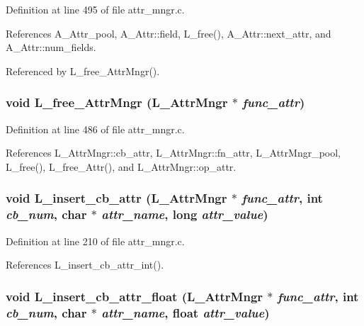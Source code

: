 Definition at line 495 of file attr\_\-mngr.c.

References A\_\-Attr\_\-pool, A\_\-Attr::field, L\_\-free(), A\_\-Attr::next\_\-attr, and A\_\-Attr::num\_\-fields.

Referenced by L\_\-free\_\-Attr\-Mngr().
\subsubsection{\setlength{\rightskip}{0pt plus 5cm}void L\_\-free\_\-Attr\-Mngr (\bf{L\_\-Attr\-Mngr} $\ast$ {\em func\_\-attr})}\label{attr__mngr_8c_8fc357fe60c6e8bb81f20cf00d53ed53}




Definition at line 486 of file attr\_\-mngr.c.

References L\_\-Attr\-Mngr::cb\_\-attr, L\_\-Attr\-Mngr::fn\_\-attr, L\_\-Attr\-Mngr\_\-pool, L\_\-free(), L\_\-free\_\-Attr(), and L\_\-Attr\-Mngr::op\_\-attr.
\subsubsection{\setlength{\rightskip}{0pt plus 5cm}void L\_\-insert\_\-cb\_\-attr (\bf{L\_\-Attr\-Mngr} $\ast$ {\em func\_\-attr}, int {\em cb\_\-num}, char $\ast$ {\em attr\_\-name}, long {\em attr\_\-value})}\label{attr__mngr_8c_bbb04f1c8e901782b4fe073cce7e94ed}




Definition at line 210 of file attr\_\-mngr.c.

References L\_\-insert\_\-cb\_\-attr\_\-int().
\subsubsection{\setlength{\rightskip}{0pt plus 5cm}void L\_\-insert\_\-cb\_\-attr\_\-float (\bf{L\_\-Attr\-Mngr} $\ast$ {\em func\_\-attr}, int {\em cb\_\-num}, char $\ast$ {\em attr\_\-name}, float {\em attr\_\-value})}\label{attr__mngr_8c_0ba3628179f76de97d2d617939a75998}




